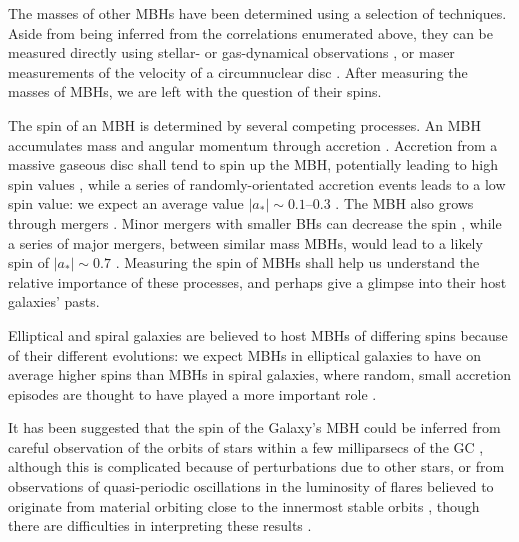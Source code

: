 The masses of other MBHs have been determined using a selection of techniques. Aside from being inferred from the correlations enumerated above, they can be measured directly using stellar- or gas-dynamical observations \citep[e.g.,][]{Macchetto1997,vanderMarel1998,Gebhardt2003}, or maser measurements of the velocity of a circumnuclear disc \citep[e.g.,][]{Miyoshi1995}. After measuring the masses of MBHs, we are left with the question of their spins.

The spin of an MBH is determined by several competing processes. An MBH accumulates mass and angular momentum through accretion \citep{Volonteri2010,King2013}. Accretion from a massive gaseous disc shall tend to spin up the MBH, potentially leading to high spin values \citep{Volonteri2005}, while a series of randomly-orientated accretion events leads to a low spin value: we expect an average value $|a_\ast| \sim 0.1$--$0.3$ \citep{King2006, King2008}. The MBH also grows through mergers \citep{Yu2002, Malbon2007}. Minor mergers with smaller BHs can decrease the spin \citep{Hughes2003, Gammie2004}, while a series of major mergers, between similar mass MBHs, would lead to a likely spin of $|a_\ast| \sim 0.7$ \citep{Gonzalez2007, Berti2007, Berti2008}. Measuring the spin of MBHs shall help us understand the relative importance of these processes, and perhaps give a glimpse into their host galaxies' pasts.

Elliptical and spiral galaxies are believed to host MBHs of differing spins because of their different evolutions: we expect MBHs in elliptical galaxies to have on average higher spins than MBHs in spiral galaxies, where random, small accretion episodes are thought to have played a more important role \citep{Volonteri2007, Sikora2007}.

It has been suggested that the spin of the Galaxy's MBH could be inferred from careful observation of the orbits of stars within a few milliparsecs of the GC \citep{Merritt2010}, although this is complicated because of perturbations due to other stars, or from observations of quasi-periodic oscillations in the luminosity of flares believed to originate from material orbiting close to the innermost stable orbits \citep{Genzel2003a, Belanger2006, Trippe2007, Hamaus2009, Kato2010}, though there are difficulties in interpreting these results \citep{Psaltis2008a}.


